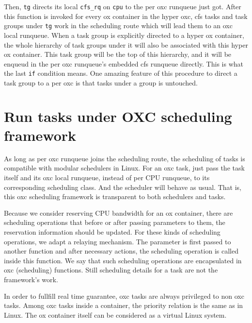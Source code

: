 Then, \texttt{tg} directs its local \texttt{cfs\_rq} on \texttt{cpu} to 
the per oxc runqueue just got. After this function is invoked for every
ox container in the hyper oxc, cfs tasks and task groups 
under \texttt{tg} work in the scheduling route which will lead them to an 
oxc local runqueue. When a task group is explicitly directed to a hyper
ox container, the whole hierarchy of task groups under it will also be
associated with this hyper ox container. This task group will be the top of
this hierarchy, and it will be enqueud in the per oxc runqueue's embedded cfs 
runqueue directly. This is what the last \texttt{if} condition means.
One amazing feature of this procedure to direct a task group to a per oxc 
is that tasks under a group is untouched.

\section{Run tasks under OXC scheduling framework}
As long as per oxc runqueue joins the scheduling route, the scheduling 
of tasks is compatible with modular schedulers in Linux. For an oxc task,
just pass the task itself and its oxc local runqueue, instead of per CPU
runqueue, to its corresponding scheduling class. And the scheduler will
behave as usual. That is, this oxc scheduling framework is transparent
to both schedulers and tasks.

Because we consider reserving CPU bandwidth for an ox container, there
are scheduling operations that before or after passing parameters to them,
the reservation information should be updated. For these kinds of scheduling
operations, we adapt a relaying mechanism. The parameter is first passed to
another function and after necessary actions, the scheduling operation is
called inside this function. We say that such scheduling operations are
encapsulated in oxc (scheduling) functions.
Still scheduling details for a task are not the framework's work. 

In order to fullfill real time guarantee, oxc tasks are always privileged
to non oxc tasks. Among oxc tasks inside a container, the priority relation
is the same as in Linux. The ox container itself can be considered as a 
virtual Linux system.

